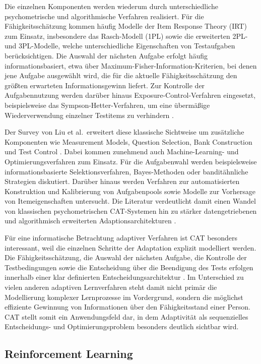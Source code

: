 Die einzelnen Komponenten werden wiederum durch unterschiedliche
psychometrische und algorithmische Verfahren realisiert. Für die
Fähigkeitsschätzung kommen häufig Modelle der Item Response Theory (IRT)
zum Einsatz, insbesondere das Rasch-Modell (1PL) sowie die erweiterten
2PL- und 3PL-Modelle, welche unterschiedliche Eigenschaften von
Testaufgaben berücksichtigen. Die Auswahl der nächsten Aufgabe erfolgt
häufig informationsbasiert, etwa über
Maximum-Fisher-Information-Kriterien, bei denen jene Aufgabe ausgewählt
wird, die für die aktuelle Fähigkeitsschätzung den größten erwarteten
Informationsgewinn liefert. Zur Kontrolle der Aufgabennutzung werden
darüber hinaus Exposure-Control-Verfahren eingesetzt, beispielsweise das
Sympson-Hetter-Verfahren, um eine übermäßige Wiederverwendung einzelner
Testitems zu verhindern \citep{Han2018}.

Der Survey von Liu et al.~erweitert diese klassische Sichtweise um
zusätzliche Komponenten wie Measurement Models, Question Selection, Bank
Construction und Test Control \citep{Liu2024}. Dabei kommen zunehmend
auch Machine-Learning- und Optimierungsverfahren zum Einsatz. Für die
Aufgabenwahl werden beispielsweise informationsbasierte
Selektionsverfahren, Bayes-Methoden oder banditähnliche Strategien
diskutiert. Darüber hinaus werden Verfahren zur automatisierten
Konstruktion und Kalibrierung von Aufgabenpools sowie Modelle zur
Vorhersage von Itemeigenschaften untersucht. Die Literatur verdeutlicht
damit einen Wandel von klassischen psychometrischen CAT-Systemen hin zu
stärker datengetriebenen und algorithmisch erweiterten
Adaptionsarchitekturen \citep{Liu2024}.

Für eine informatische Betrachtung adaptiver Verfahren ist CAT besonders
interessant, weil die einzelnen Schritte der Adaptation explizit
modelliert werden. Die Fähigkeitsschätzung, die Auswahl der nächsten
Aufgabe, die Kontrolle der Testbedingungen sowie die Entscheidung über
die Beendigung des Tests erfolgen innerhalb einer klar definierten
Entscheidungsarchitektur \citep{Han2018, Liu2024}. Im Unterschied zu
vielen anderen adaptiven Lernverfahren steht damit nicht primär die
Modellierung komplexer Lernprozesse im Vordergrund, sondern die
möglichst effiziente Gewinnung von Informationen über den
Fähigkeitsstand einer Person. CAT stellt somit ein Anwendungsfeld dar,
in dem Adaptivität als sequenzielles Entscheidungs- und
Optimierungsproblem besonders deutlich sichtbar wird.

\subsection{Reinforcement Learning}\label{reinforcement-learning}

